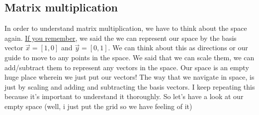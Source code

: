 \documentclass[
]{book}
\theoremstyle{definition}
\theoremstyle{definition}
\theoremstyle{definition}
\theoremstyle{remark}
\begin{document}
\hypertarget{matrix-multiplication}{%
\subsection{Matrix multiplication}\label{matrix-multiplication}}

In order to understand matrix multiplication, we have to think about the space again. \protect\hyperlink{bvectors}{If you remember}, we said the we can represent our space by the basis vector \(\vec{x}=[1,0]\) and \(\vec{y}=[0,1]\). We can think about this as directions or our guide to move to any points in the space. We said that we can scale them, we can add/subtract them to represent any vectors in the space. Our space is an empty huge place wherein we just put our vectors! The way that we navigate in space, is just by scaling and adding and subtracting the basis vectors. I keep repeating this because it's important to understand it thoroughly. So let's have a look at our empty space (well, i just put the grid so we have feeling of it)
\end{document}
